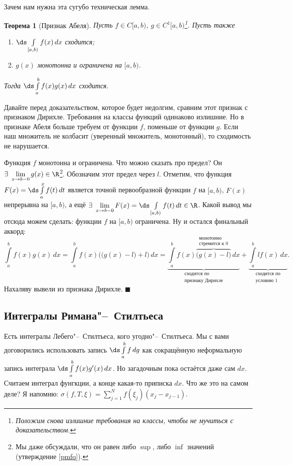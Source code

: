 \documentclass[a4paper,10pt,twoside]{article}
\newtheorem{The}{Теорема}[section]
\newenvironment{Proof}
       {\par\noindent{\textbf{Доказательство.}}}
       {\hfill$\scriptstyle\blacksquare$}
\begin{document}
	Зачем нам нужна эта сугубо техническая лемма.
	\begin{The}[Признак Абеля]
	Пусть $f\in C[a,b)$, $g\in C^1[a,b)$\footnote{Положим снова излишние требования на классы, чтобы не мучиться с доказательством.}.
	Пусть также
	\begin{enumerate}
	  \item $\ds\int\limits_{[a,b)}f(x)\,dx$ сходится;
	  \item $g(x)$ монотонна и ограничена на $[a,b)$.
	\end{enumerate}
	Тогда $\ds\int\limits_a^bf(x)g(x)\,dx$ сходится.
	\end{The}
	Давайте перед доказательством, которое будет недолгим, сравним этот признак с признаком Дирихле. Требования на классы функций одинаково излишние. Но в признаке Абеля больше требуем от функции
	$f$, поменьше от функции $g$. Если наш множитель не колбасит (уверенный множитель, монотонный), то сходимость не нарушается.
	\begin{Proof}
	Функция $f$ монотонна и ограничена. Что можно сказать про предел? Он $\exists\ \lim\limits_{x\to b-0}g(x)\in\R$\footnote{Мы даже обсуждали, что
	он равен либо $\sup$, либо $\inf$ значений (утверждение \ref{pmfq}).}.
	Обозначим этот предел через $l$. Отметим, что функция $F(x)=\ds\int\limits_a^xf(t)\,dt$ является точной первообразной функции $f$ на $[a,b)$, 
	$F(x)$ непрерывна на $[a,b)$, а ещё $\exists\ \lim\limits_{x\to b-0}F(x)=\ds\int\limits_{[a,b)}f(t)\,dt\in\R$.
	Какой вывод мы отсюда можем сделать: \tp{} функции $f$ на $[a,b)$ ограничена. Ну и остался финальный аккорд:
	\[\int\limits_a^bf(x)g(x)\,dx=\int\limits_a^bf(x)\Big(\big(g(x)-l\big)+l\Big)\,dx=
	\underbrace{\int\limits_a^bf(x)\overbrace{\big(g(x)-l\big)}^{\substack{\text{монотонно}\\ \text{стремится к }0}}\,dx}_{\substack{\text{сходится по}\\ \text{признаку Дирихле}}}+
	\underbrace{\int\limits_a^blf(x)\,dx}_{\substack{\text{сходится по}\\ \text{условию 1}}}.\]
	Нахаляву вывели из признака Дирихле.
	\end{Proof}
	
	\subsection{Интегралы Римана"--~Стилтьеса}
	Есть интегралы Лебего"--~Стилтьеса, кого угодно"--~Стилтьеса. Мы с вами договорились использовать запись $\ds\int\limits_a^bf\,dg$ как сокращённую
	неформальную запись интеграла $\ds\int\limits_a^bf(x)g'(x)\,dx$. Но загадочным пока остаётся даже сам $dx$. Считаем интеграл фунгкции, а конце какая-то приписка $dx$.
	Что же это на самом деле? Я напомню: $\sigma(f,T,\xi)=\sum\limits_{j=1}^Nf(\xi_j)(x_j-x_{j-1})$.
	
\end{document}
